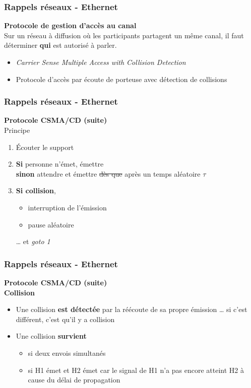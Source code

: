 \begin{frame}[fragile]
  \frametitle{Rappels réseaux - Ethernet}
{\large\bf Protocole de gestion d'accès au canal}\\
Sur un réseau à diffusion où les participants partagent un même canal, il faut
déterminer \textbf{qui} est autorisé à parler.

\vspace{.7cm}{\bf Protocole CSMA/CD}
\begin{itemize}
	\item {\it Carrier Sense Multiple Access with Collision Detection}
	\item Protocole d'accès par écoute de porteuse avec détection de collisions
\end{itemize}
\end{frame}

\begin{frame}[fragile]
  \frametitle{Rappels réseaux - Ethernet}
{\large\bf Protocole CSMA/CD (suite)}\\
Principe
\begin{enumerate}
	\item Écouter le support
	\item \textbf{Si} personne n'émet, émettre \\
	\textbf{sinon} attendre et émettre \sout{dès que} après un temps aléatoire
	$\tau$
	\item \textbf{Si collision}, 
	\begin{itemize}
		\item interruption de l'émission
		\item pause aléatoire 
	\end{itemize}
	… et \textit{goto 1}
\end{enumerate}
\end{frame}

\begin{frame}[fragile]
  \frametitle{Rappels réseaux - Ethernet}
{\large\bf Protocole CSMA/CD (suite)}\\
\textbf{Collision} 
\begin{itemize}
	\item Une collision \textbf{est détectée} par la réécoute de sa propre émission … si
	c'est différent, c'est qu'il y a collision
	\item Une collision \textbf{survient} 
	\begin{itemize}
		\item si deux envois simultanés
		\item si H1 émet et H2 émet car le signal de H1 n'a pas encore atteint
		H2 à cause du délai de propagation
	\end{itemize}
\end{itemize}
\end{frame}


